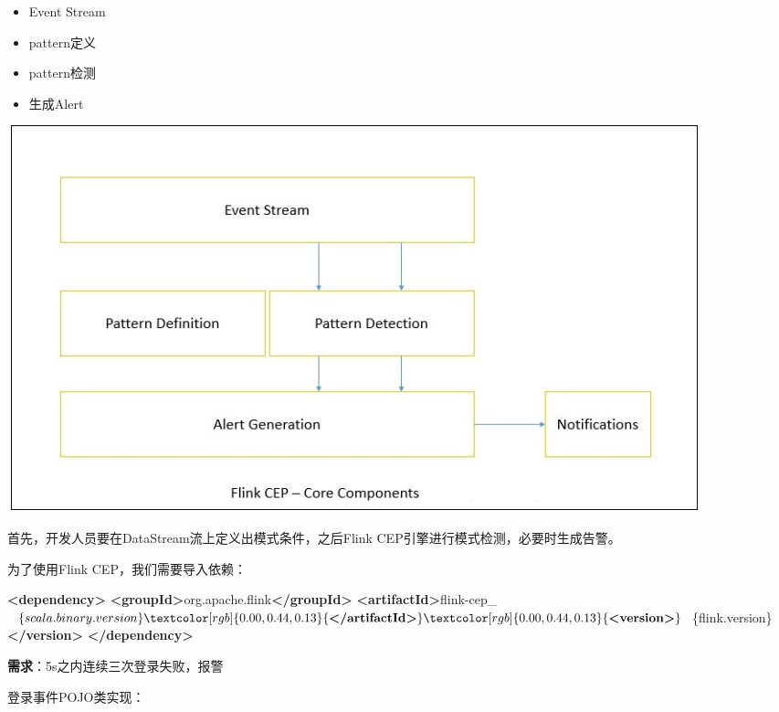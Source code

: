 \documentclass[cn,11pt,chinese]{elegantbook}
\newenvironment{Shaded}{}{}
\newcommand{\KeywordTok}[1]{\textcolor[rgb]{0.00,0.44,0.13}{\textbf{#1}}}
\newcommand{\NormalTok}[1]{#1}
\providecommand{\tightlist}{%
  \setlength{\itemsep}{0pt}\setlength{\parskip}{0pt}}
\begin{document}
\begin{itemize}
\tightlist
\item
  Event Stream
\item
  pattern定义
\item
  pattern检测
\item
  生成Alert
\end{itemize}

\includegraphics{images/cep6.png}

首先，开发人员要在DataStream流上定义出模式条件，之后Flink
CEP引擎进行模式检测，必要时生成告警。

为了使用Flink CEP，我们需要导入依赖：

\begin{Shaded}
\begin{Highlighting}[]
\KeywordTok{\textless{}dependency\textgreater{}}
  \KeywordTok{\textless{}groupId\textgreater{}}\NormalTok{org.apache.flink}\KeywordTok{\textless{}/groupId\textgreater{}}
  \KeywordTok{\textless{}artifactId\textgreater{}}\NormalTok{flink{-}cep\_$\{scala.binary.version\}}\KeywordTok{\textless{}/artifactId\textgreater{}}
  \KeywordTok{\textless{}version\textgreater{}}\NormalTok{$\{flink.version\}}\KeywordTok{\textless{}/version\textgreater{}}
\KeywordTok{\textless{}/dependency\textgreater{}}
\end{Highlighting}
\end{Shaded}

\textbf{需求}：5s之内连续三次登录失败，报警

登录事件POJO类实现：
\end{document}
